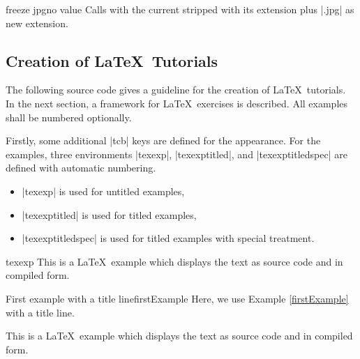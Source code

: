 \begin{docTcbKey}[][doc new=2016-07-14]{freeze jpg}{}{no value}
  Calls  with the current 
  stripped with its extension plus |.jpg| as new extension.
\end{docTcbKey}




\clearpage
\subsection{Creation of \LaTeX\ Tutorials}\label{sec:latextutorial}
The following source code gives a guideline for the creation of \LaTeX\ tutorials.
In the next section, a framework for \LaTeX\ exercises is described.
All examples shall be numbered optionally.

Firstly, some additional |tcb| keys are defined for the appearance.
For the examples, three environments |texexp|, |texexptitled|,
and |texexptitledspec| are defined with automatic numbering.

\begin{itemize}
\item |texexp| is used for untitled examples,
\item |texexptitled| is used for titled examples,
\item |texexptitledspec| is used for titled examples with special treatment.
\end{itemize}


\begin{dispExample}
\begin{tcblisting}{texexp}
This is a \LaTeX\ example which displays the text as source code
and in compiled form.
\end{tcblisting}
\end{dispExample}


\begin{dispExample}
\begin{texexptitled}{First example with a title line}{firstExample}
Here, we use Example \ref{firstExample} with a title line.
\end{texexptitled}
\end{dispExample}


\begin{dispExample}
\begin{texexp}{}
This is a \LaTeX\ example which displays the text as source code
and in compiled form.
\end{texexp}
\end{dispExample}


